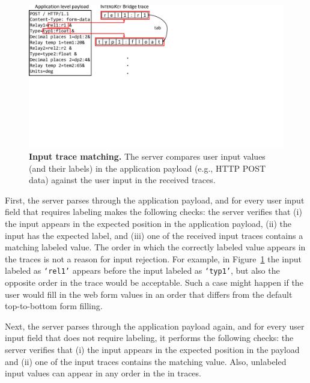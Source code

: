 \begin{figure}[t]
 \centering
 \includegraphics[trim={0 8cm 15cm 0},clip,width=0.8\linewidth]{chapters/IntegriKey/images/FieldPayload.pdf}
 \caption[Input trace matching]{\textbf{Input trace matching.} The server compares user input values (and their labels) in the application payload (e.g., HTTP POST data) against the user input in the received traces.} \vspace{-10pt}
 \label{fig:payload}
\end{figure}


 First, the server parses through the application payload, and for every user input field that requires labeling makes the following checks: the server verifies that (i) the input appears in the expected position in the application payload, (ii) the input has the expected label, and (iii) one of the received input traces contains a matching labeled value. The order in which the correctly labeled value appears in the traces is not a reason for input rejection. For example, in Figure~\ref{fig:payload} the input labeled as \texttt{`rel1'} appears before the input labeled as \texttt{`typ1'}, but also the opposite order in the trace would be acceptable. Such a case might happen if the user would fill in the web form values in an order that differs from the default top-to-bottom form filling.

 Next, the server parses through the application payload again, and for every user input field that does not require labeling, it performs the following checks: the server verifies that (i) the input appears in the expected position in the payload and (ii) one of the input traces contains the matching value. Also, unlabeled input values can appear in any order in the in traces.
